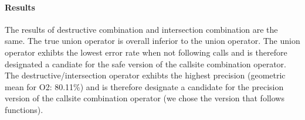 \paragraph{Results} The results of destructive combination and intersection combination are the same. The true union operator is overall inferior to the union operator. The union operator exhibts the lowest error rate when not following calls and is therefore  designated a candiate for the safe version of the callsite combination operator. The destructive/intersection operator exhibts the highest precision (geometric mean for O2: 80.11\%) and is therefore designate a candidate for the precision version of the callsite combination operator (we chose the version that follows functions).

\begin{table}[!htbp]
\end{table}
